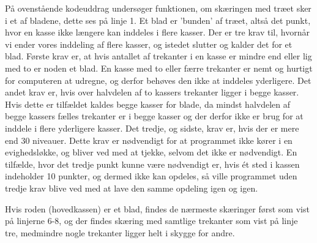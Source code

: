 På ovenstående kodeuddrag undersøger funktionen, om skæringen med træet sker i et af bladene, dette ses på linje 1. Et blad er 'bunden' af træet, altså det punkt, hvor en kasse ikke længere kan inddeles i flere kasser. Der er tre krav til, hvornår vi ender vores inddeling af flere kasser, og istedet slutter og kalder det for et blad. Første krav er, at hvis antallet af trekanter i en kasse er mindre end eller lig med to er noden et blad. En kasse med to eller færre trekanter er nemt og hurtigt for computeren at udregne, og derfor behøves den ikke at inddeles yderligere. Det andet krav er, hvis over halvdelen af to kassers trekanter ligger i begge kasser. Hvis dette er tilfældet kaldes begge kasser for blade, da mindst halvdelen af begge kassers fælles trekanter er i begge kasser og der derfor ikke er brug for at inddele i flere yderligere kasser. Det tredje, og sidste, krav er, hvis der er mere end 30 niveauer. Dette krav er nødvendigt for at programmet ikke kører i en evighedsløkke, og bliver ved med at tjekke, selvom det ikke er nødvendigt. En tilfælde, hvor det tredje punkt kunne være nødvendigt er, hvis ét sted i kassen indeholder 10 punkter, og dermed ikke kan opdeles, så ville programmet uden tredje krav blive ved med at lave den samme opdeling igen og igen.


Hvis roden (hovedkassen) er et blad, findes de nærmeste skæringer først som vist på linjerne 6-8, og der findes skæring med samtlige trekanter som vist på linje tre, medmindre nogle trekanter ligger helt i skygge for andre. 

